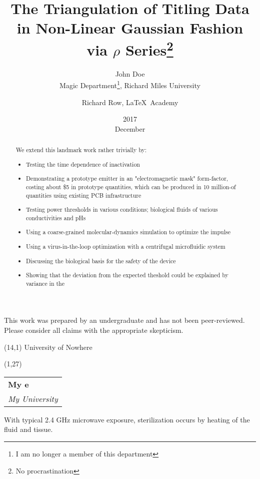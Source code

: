 \documentclass[fleqn,10pt]{article}
\title{The Triangulation of Titling Data in Non-Linear Gaussian Fashion via $\rho$ Series\thanks{No procrastination}}
\date{2017\\ December}
\author{John Doe\\ Magic Department\thanks{I am no longer a member of this department}, Richard Miles University 
\and Richard Row, \LaTeX\ Academy}
\begin{document}
\flushbottom 
\maketitle
\thispagestyle{empty}

This work was prepared by an undergraduate and has not been peer-reviewed. 
Please consider all claims with the appropriate skepticism.


\begin{textblock}{5}(14,1)
\noindent University of Nowhere
\end{textblock}
\begin{textblock}{5}(1,27)
\end{textblock}

\null\hfill\begin{tabular}[t]{l@{}}
  \textbf{My e} \\
  \textit{My University}
\end{tabular}



\begin{abstract}
We extend this landmark work rather trivially by:
\begin{itemize}
  \item Testing the time dependence of inactivation
  \item Demonstrating a prototype emitter in an "electromagnetic mask" form-factor, costing about \$5 in prototype quantities, which can be produced in 10 million-of quantities using existing PCB infrastructure  
  \item Testing power thresholds in various conditions; biological fluids of various conductivities and pHs
  \item Using a coarse-grained molecular-dynamics simulation to optimize the impulse
  \item Using a virus-in-the-loop optimization with a centrifugal microfluidic system
  \item Discussing the biological basis for the safety of the device
  \item Showing that the deviation from the expected theshold could be explained by variance in the 
\end{itemize}
\end{abstract}











With typical 2.4 GHz microwave exposure, sterilization occurs by heating of the fluid and tissue.
\end{document}
